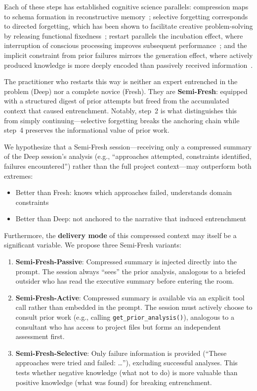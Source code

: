 \documentclass[11pt]{article}
\begin{document}
Each of these steps has established cognitive science parallels: compression maps to schema formation in reconstructive memory~\citep{bartlett1932remembering}; selective forgetting corresponds to directed forgetting, which has been shown to facilitate creative problem-solving by releasing functional fixedness~\citep{storm2012forgetting}; restart parallels the incubation effect, where interruption of conscious processing improves subsequent performance~\citep{sio2009incubation}; and the implicit constraint from prior failures mirrors the generation effect, where actively produced knowledge is more deeply encoded than passively received information~\citep{slamecka1978generation}.

The practitioner who restarts this way is neither an expert entrenched in the problem (Deep) nor a complete novice (Fresh). They are \textbf{Semi-Fresh}: equipped with a structured digest of prior attempts but freed from the accumulated context that caused entrenchment. Notably, step~2 is what distinguishes this from simply continuing---selective forgetting breaks the anchoring chain while step~4 preserves the informational value of prior work.

We hypothesize that a Semi-Fresh session---receiving only a compressed summary of the Deep session's analysis (e.g., ``approaches attempted, constraints identified, failures encountered'') rather than the full project context---may outperform both extremes:

\begin{itemize}[leftmargin=1.5em]
  \item Better than Fresh: knows which approaches failed, understands domain constraints
  \item Better than Deep: not anchored to the narrative that induced entrenchment
\end{itemize}

Furthermore, the \textbf{delivery mode} of this compressed context may itself be a significant variable. We propose three Semi-Fresh variants:

\begin{enumerate}[label=\arabic*., leftmargin=1.5em]
  \item \textbf{Semi-Fresh-Passive}: Compressed summary is injected directly into the prompt. The session always ``sees'' the prior analysis, analogous to a briefed outsider who has read the executive summary before entering the room.
  \item \textbf{Semi-Fresh-Active}: Compressed summary is available via an explicit tool call rather than embedded in the prompt. The session must actively choose to consult prior work (e.g., calling \texttt{get\_prior\_analysis()}), analogous to a consultant who has access to project files but forms an independent assessment first.
  \item \textbf{Semi-Fresh-Selective}: Only failure information is provided (``These approaches were tried and failed: \ldots''), excluding successful analyses. This tests whether negative knowledge (what not to do) is more valuable than positive knowledge (what was found) for breaking entrenchment.
\end{enumerate}
\end{document}
